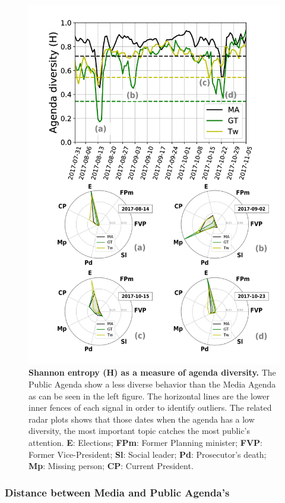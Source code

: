 \documentclass[a4paper, 12pt]{article}
\begin{document}
\begin{figure}[H]
\centering
\includegraphics[height=0.75\textheight]{images/Fig3.pdf}
\caption{\textbf{Shannon entropy (H) as a measure of agenda diversity.} The Public Agenda show a less diverse behavior than the Media Agenda as can be seen in the left figure. The horizontal lines are the lower inner fences of each signal in order to identify outliers. The related radar plots shows that those dates when the agenda has a low diversity, the most important topic catches the most public’s attention. \textbf{E}: Elections; \textbf{FPm}: Former Planning minister; \textbf{FVP}: Former Vice-President; \textbf{Sl}: Social leader; \textbf{Pd}: Prosecutor's death; \textbf{Mp}: Missing person; \textbf{CP}: Current President.}
\label{fig:shannon_entropy_agendas}
\end{figure}

\subsubsection{Distance between Media and Public Agenda's }
\end{document}
